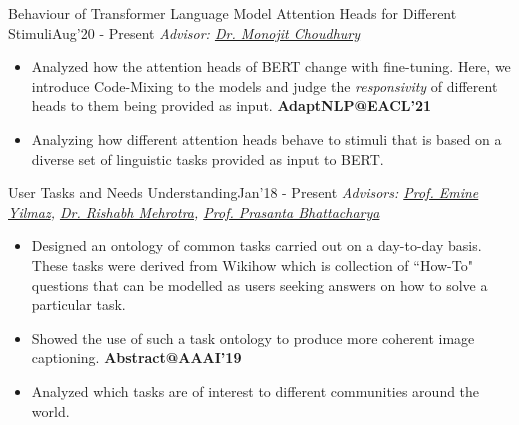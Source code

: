 \begin{projects}
\project
    {Behaviour of Transformer Language Model Attention Heads for Different Stimuli}{Aug'20 - Present}
	{ \textit{Advisor: \href{https://www.microsoft.com/en-us/research/people/monojitc/}{Dr. Monojit Choudhury}}}
	{
	\begin{itemize}
	\setlength\itemsep{0.3em}
     \item Analyzed how the attention heads of BERT change with fine-tuning. Here, we introduce Code-Mixing to the models and judge the \textit{responsivity} of different heads to them being provided as input. {\small{\lbrack\textbf{{AdaptNLP@EACL'21}}\rbrack}}
     \item Analyzing how different attention heads behave to stimuli that is based on a diverse set of linguistic tasks provided as input to BERT. {\small{\rbrack} }
     \end{itemize}
     }
     
\project
    {User Tasks and Needs Understanding}{Jan'18 - Present}
	{ \textit{\textit{Advisors: \href{https://sites.google.com/site/emineyilmaz/}{Prof. Emine Yilmaz}, \href{http://rishabhmehrotra.com/}{Dr. Rishabh Mehrotra}, \href{https://bizfaculty.nus.edu.sg/faculty-details/?profId=588}{Prof. Prasanta Bhattacharya}}}}
	{
	\begin{itemize}
	\setlength\itemsep{0.3em}
     \item Designed an ontology of common tasks carried out on a day-to-day basis. These tasks were derived from Wikihow which is collection of ``How-To" questions that can be modelled as users seeking answers on how to solve a particular task.
     \item Showed the use of such a task ontology to produce more coherent image captioning. {\small{\lbrack\textbf{{Abstract@AAAI'19}}\rbrack}}
     \item Analyzed which tasks are of interest to different communities around the world. {\small{\rbrack}}
     
     \end{itemize}
     }
\end{projects}    
\vspace{-3mm}

